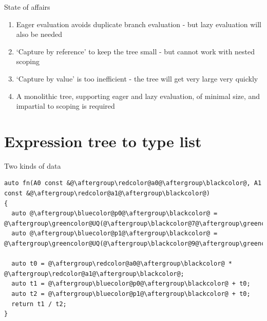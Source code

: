 \documentclass[xcolor=dvipsnames]{beamer}
\begin{document}
\begin{frame}[fragile]{State of affairs}
  \begin{enumerate}
  \item Eager evaluation avoids duplicate branch evaluation - but lazy evaluation will also be needed \vspace{5mm}
  \item `Capture by reference' to keep the tree small - but cannot work with nested scoping \vspace{5mm}
  \item `Capture by value' is too inefficient - the tree will get very large very quickly \vspace{5mm}
  \item A monolithic tree, supporting eager and lazy evaluation, of minimal size, and impartial to scoping is required \vspace{5mm}
  \end{enumerate}
\end{frame}


\section{Expression tree to type list}

\begin{frame}[fragile]{Two kinds of data}
\begin{lstlisting}
auto fn(A0 const &@\aftergroup\redcolor@a0@\aftergroup\blackcolor@, A1 const &@\aftergroup\redcolor@a1@\aftergroup\blackcolor@)
{
  auto @\aftergroup\bluecolor@p0@\aftergroup\blackcolor@ = @\aftergroup\greencolor@UQ(@\aftergroup\blackcolor@7@\aftergroup\greencolor@)@\aftergroup\blackcolor@;
  auto @\aftergroup\bluecolor@p1@\aftergroup\blackcolor@ = @\aftergroup\greencolor@UQ(@\aftergroup\blackcolor@9@\aftergroup\greencolor@)@\aftergroup\blackcolor@;

  auto t0 = @\aftergroup\redcolor@a0@\aftergroup\blackcolor@ * @\aftergroup\redcolor@a1@\aftergroup\blackcolor@;
  auto t1 = @\aftergroup\bluecolor@p0@\aftergroup\blackcolor@ + t0;
  auto t2 = @\aftergroup\bluecolor@p1@\aftergroup\blackcolor@ + t0;
  return t1 / t2;
}
\end{lstlisting}
\end{frame}
\end{document}
